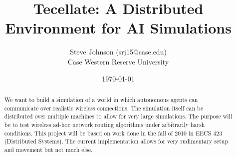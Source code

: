 \documentclass[12pt]{article}
\title{Tecellate: A Distributed Environment for AI Simulations}
\author{
        Steve Johnson (srj15@case.edu)\\
        Case Western Reserve University\\
}
\date{\today}
\begin{document}
\doublespacing
\maketitle


\begin{abstract}
    We want to build a simulation of a world in which autonomous agents can communicate over realistic wireless connections. The simulation itself can be distributed over multiple machines to allow for very large simulations. The purpose will be to test wireless ad-hoc network routing algorithms under arbitrarily harsh conditions.
    This project will be based on work done in the fall of 2010 in EECS 423 (Distributed Systems). The current implementation allows for very rudimentary setup and movement but not much else.
\end{abstract}









% 
% 
\end{document}
